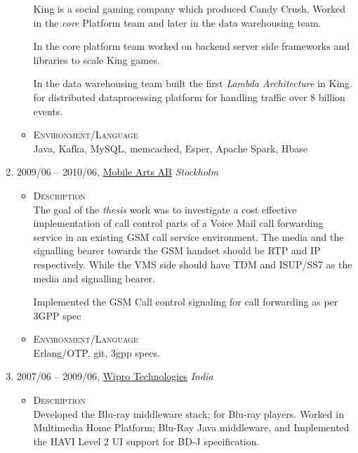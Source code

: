 \documentclass[a4paper,10pt]{article}
\begin{document}
\begin{enumerate}
\begin{itemize}
      King is a social gaming company which produced Candy Crush.
      Worked in the \emph{core} Platform team and later in the data warehousing team.

      In the core platform team worked on backend server side frameworks and libraries
      to scale King games.

      In the data warehousing team built the first \emph {Lambda Architecture} in King.
      for distributed dataprocessing platform for handling traffic over 8 billion events.

     \item \textsc {Environment/Language} \\
       Java, Kafka, MySQL, memcached, Esper, Apache Spark, Hbase

   \end{itemize}
  
\item \textsc{2009/06} – \textsc{2010/06}, \href{www.mobilearts.com}{Mobile Arts AB} \emph {Stockholm} \\
  \begin{itemize}
    \item \textsc{Description} \\
  
  The goal of the \emph{thesis} work was to investigate a cost effective implementation of call control parts of a Voice Mail call forwarding service in an existing GSM call service environment. The media and the signalling bearer towards the GSM handset should be RTP and IP respectively. While the VMS side should have TDM and ISUP/SS7 as the media and signalling bearer.

  Implemented the GSM Call control signaling for call forwarding as per 3GPP spec

  \item \textsc{Environment/Language} \\
  Erlang/OTP, git, 3gpp specs.

   \end{itemize}

\item \textsc{2007/06} – \textsc{2009/06}, \href{www.wipro.com}{Wipro Technologies} \emph {India} \\

  \begin{itemize}
    \item \textsc{Description} \\
      Developed the Blu-ray middleware stack; for Blu-ray players. Worked in Multimedia Home Platform; Blu-Ray Java middleware, and Implemented the HAVI Level 2 UI support for BD-J specification.


\end{itemize}
\end{enumerate}
\end{document}
